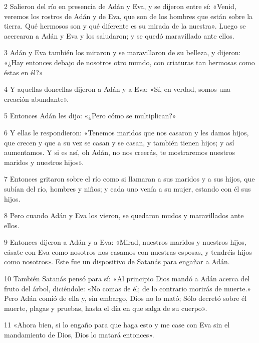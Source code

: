 \par 2 Salieron del río en presencia de Adán y Eva, y se dijeron entre sí: «Venid, veremos los rostros de Adán y de Eva, que son de los hombres que están sobre la tierra. Qué hermosos son y qué diferente es su mirada de la nuestra». Luego se acercaron a Adán y Eva y los saludaron; y se quedó maravillado ante ellos.

\par 3 Adán y Eva también los miraron y se maravillaron de su belleza, y dijeron: «¿Hay entonces debajo de nosotros otro mundo, con criaturas tan hermosas como éstas en él?»

\par 4 Y aquellas doncellas dijeron a Adán y a Eva: «Sí, en verdad, somos una creación abundante».

\par 5 Entonces Adán les dijo: «¿Pero cómo se multiplican?»

\par 6 Y ellas le respondieron: «Tenemos maridos que nos casaron y les damos hijos, que crecen y que a su vez se casan y se casan, y también tienen hijos; y así aumentamos. Y si es así, oh Adán, no nos creerás, te mostraremos nuestros maridos y nuestros hijos».

\par 7 Entonces gritaron sobre el río como si llamaran a sus maridos y a sus hijos, que subían del río, hombres y niños; y cada uno venía a su mujer, estando con él sus hijos.

\par 8 Pero cuando Adán y Eva los vieron, se quedaron mudos y maravillados ante ellos.

\par 9 Entonces dijeron a Adán y a Eva: «Mirad, nuestros maridos y nuestros hijos, cásate con Eva como nosotros nos casamos con nuestras esposas, y tendréis hijos como nosotros». Este fue un dispositivo de Satanás para engañar a Adán.

\par 10 También Satanás pensó para sí: «Al principio Dios mandó a Adán acerca del fruto del árbol, diciéndole: «No comas de él; de lo contrario morirás de muerte.» Pero Adán comió de ella y, sin embargo, Dios no lo mató; Sólo decretó sobre él muerte, plagas y pruebas, hasta el día en que salga de su cuerpo».

\par 11 «Ahora bien, si lo engaño para que haga esto y me case con Eva sin el mandamiento de Dios, Dios lo matará entonces».

